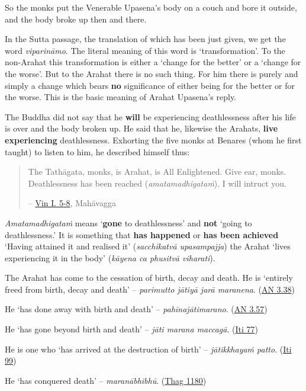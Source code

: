So the monks put the Venerable Upasena's body on a couch and bore it outside, and the body broke up then and there.

In the Sutta passage, the translation of which has been just given, we get the word \emph{viparināmo}. The literal meaning of this word is `transformation'. To the non-Arahat this transformation is either a `change for the better' or a `change for the worse'. But to the Arahat there is no such thing. For him there is purely and simply a change which bears \textbf{no} significance of either being for the better or for the worse. This is the basic meaning of Arahat Upasena's reply.

The Buddha did not say that he \textbf{will} be experiencing deathlessness after his life is over and the body broken up. He said that he, likewise the Arahats, \textbf{live experiencing} deathlessness. Exhorting the five monks at Benares (whom he first taught) to listen to him, he described himself thus:

\begin{quote}
The Tathāgata, monks, is Arahat, is All Enlightened. Give ear, monks. Deathlessness has been reached (\emph{amatamadhigataṁ}). I will intruct you.

 -- \href{https://suttacentral.net/pli-tv-kd1/en/brahmali}{Vin I. 5-8}, Mahāvagga
\end{quote}

\emph{Amatamadhigataṁ} means `\textbf{gone} to deathlessness' and \textbf{not} `going to deathlessness.' It is something that \textbf{has happened} or \textbf{has been achieved} `Having attained it and realised it' (\emph{sacchikatvā upasampajja}) the Arahat `lives experiencing it in the body' (\emph{kāyena ca phusitvā viharati}).

The Arahat has come to the cessation of birth, decay and death. He is `entirely freed from birth, decay and death' -- \emph{parimutto jātiyā jarā maranena}. (\href{https://suttacentral.net/an3.38/en/bodhi}{AN 3.38})

He `has done away with birth and death' -- \emph{pahīnajātimarano}. (\href{https://suttacentral.net/an3.57/en/bodhi}{AN 3.57})

He `has gone beyond birth and death' -- \emph{jāti marana maccagā}. (\href{https://suttacentral.net/iti77/en/sujato}{Iti 77})

He is one who `has arrived at the destruction of birth' -- \emph{jātikkhayaṁ patto}. (\href{https://suttacentral.net/iti99/en/sujato}{Iti 99})

He `has conquered death' -- \emph{maranābhibhū}. (\href{https://suttacentral.net/thag20.1/en/sujato}{Thag 1180})


